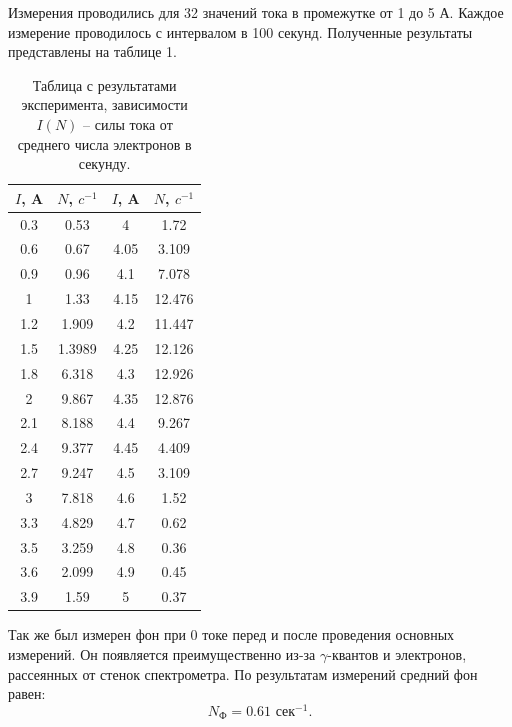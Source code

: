 \documentclass[a4paper, 14pt]{extarticle}%
\newcommand\ECaption[1]{%
     \captionsetup{font=footnotesize}%
     \caption{#1}}
\begin{document}
Измерения проводились для 32 значений тока в промежутке от 1 до 5 А. Каждое измерение проводилось с интервалом в 100 секунд. Полученные результаты представлены на таблице 1.
\begin{table}[h!]
\begin{center}
\begin{tabular}{|c|c|c|c|}
\hline
\rowcolor[HTML]{6665CD} 
$I$, A & $N$, $c^{-1}$ & $I$, A & $N$, $c^{-1}$ \\ \hline
0.3    & 0.53          & 4      & 1.72          \\ \hline
\rowcolor[HTML]{CBCEFB} 
0.6    & 0.67          & 4.05   & 3.109         \\ \hline
0.9    & 0.96          & 4.1    & 7.078         \\ \hline
\rowcolor[HTML]{CBCEFB} 
1      & 1.33          & 4.15   & 12.476        \\ \hline
1.2    & 1.909         & 4.2    & 11.447        \\ \hline
\rowcolor[HTML]{CBCEFB} 
1.5    & 1.3989        & 4.25   & 12.126        \\ \hline
1.8    & 6.318         & 4.3    & 12.926        \\ \hline
\rowcolor[HTML]{CBCEFB} 
2      & 9.867         & 4.35   & 12.876        \\ \hline
2.1    & 8.188         & 4.4    & 9.267         \\ \hline
\rowcolor[HTML]{CBCEFB} 
2.4    & 9.377         & 4.45   & 4.409         \\ \hline
2.7    & 9.247         & 4.5    & 3.109         \\ \hline
\rowcolor[HTML]{CBCEFB} 
3      & 7.818         & 4.6    & 1.52          \\ \hline
3.3    & 4.829         & 4.7    & 0.62          \\ \hline
\rowcolor[HTML]{CBCEFB} 
3.5    & 3.259         & 4.8    & 0.36          \\ \hline
3.6    & 2.099         & 4.9    & 0.45          \\ \hline
\rowcolor[HTML]{CBCEFB} 
3.9    & 1.59          & 5      & 0.37          \\ \hline
\end{tabular}
\ECaption{Таблица с результатами эксперимента, зависимости $I(N)$ -- силы тока от среднего числа электронов в секунду.}
\end{center}
\end{table}

Так же был измерен фон при 0 токе перед и после проведения основных измерений. Он появляется преимущественно из-за $\gamma$-квантов и электронов, рассеянных от стенок спектрометра. По результатам измерений средний фон равен:
\[N_{\text{Ф}} = 0.61 \text{ сек}^{-1}.\]
\end{document}
